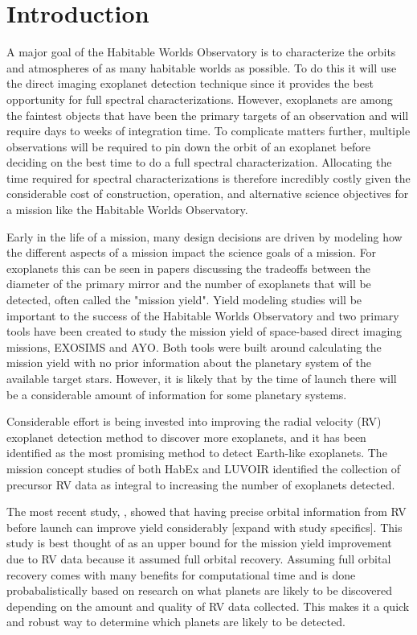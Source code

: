 \section{Introduction}
A major goal of the Habitable Worlds Observatory is to characterize the orbits
and atmospheres of as many habitable worlds as possible. To do this it will use
the direct imaging exoplanet detection technique since it provides the best
opportunity for full spectral characterizations. However, exoplanets are among
the faintest objects that have been the primary targets of an observation and
will require days to weeks of integration time. To complicate matters further,
multiple observations will be required to pin down the orbit of an exoplanet
before deciding on the best time to do a full spectral characterization.
Allocating the time required for spectral characterizations is therefore
incredibly costly given the considerable cost of construction, operation, and
alternative science objectives for a mission like the Habitable Worlds
Observatory.

Early in the life of a mission, many design decisions are driven by modeling
how the different aspects of a mission impact the science goals of a mission.
For exoplanets this can be seen in papers discussing the tradeoffs between the
diameter of the primary mirror and the number of exoplanets  that will be
detected, often called the "mission yield". Yield modeling studies will be
important to the success of the Habitable Worlds Observatory and two primary
tools have been created to study the mission yield of space-based direct
imaging missions, EXOSIMS and AYO. Both tools were built around calculating the
mission yield with no prior information about the planetary system of the
available target stars. However, it is likely that by the time of launch there
will be a considerable amount of information for some planetary systems.

Considerable effort is being invested into improving the radial velocity (RV)
exoplanet detection method to discover more exoplanets, and it has been
identified as the most promising method to detect Earth-like exoplanets. The
mission concept studies of both HabEx and LUVOIR identified the collection of
precursor RV data as integral to increasing the number of exoplanets detected.


The most recent study, \citet{morganExplorationExpectedNumber2022a}, showed
that having precise orbital information from RV before launch can improve yield
considerably [expand with study specifics]. This study is best thought of as an
upper bound for the mission yield improvement due to RV data because it assumed
full orbital recovery. Assuming full orbital recovery comes with many benefits
for computational time and is done probabalistically based on research on what
planets are likely to be discovered depending on the amount and quality of RV
data collected. This makes it a quick and robust way to determine which planets
are likely to be detected. 


